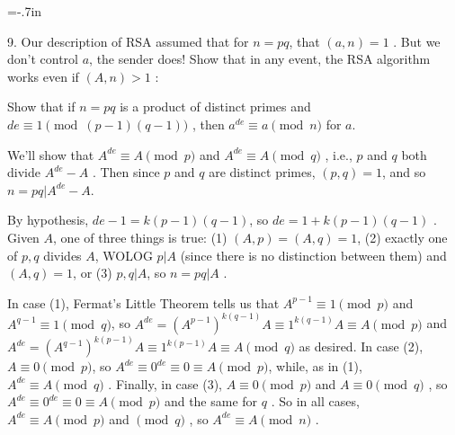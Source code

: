 



\loadmsbm

\voffset=-.7in
\vsize=8.6in



\ctln{\centerline}
\ssk{\smallskip}
\msk{\medskip}
\bsk{\bigskip}

\overfullrule=0pt
\nopagenumbers


\bsk

\item{9.} Our description of RSA assumed that for $n=pq$, that $(a,n)=1$ .
But we don't control $a$, the sender does! Show that in any event, the RSA algorithm works even if $(A,n)>1$ :

\ssk

\item{} Show that if $n=pq$ is a product of distinct primes and $de\equiv 1\pmod{(p-1)(q-1)}$ , 
then $a^{de}\equiv a \pmod{n}$ for  $a$.

\ssk

\item{} We'll show that $A^{de}\equiv A \pmod{p}$ and $A^{de}\equiv A \pmod{q}$ , i.e., $p$ and $q$ both divide
$A^{de}-A$ . Then since $p$ and $q$ are distinct primes, $(p,q)=1$, and so $n=pq|A^{de}-A$.

\ssk

\item{} By hypothesis, $de-1=k(p-1)(q-1)$, so $de=1+k(p-1)(q-1)$ . Given $A$, one of three things is true: (1) $(A,p)=(A,q)=1$, 
(2) exactly one of $p,q$ divides $A$, WOLOG $p|A$ (since there is no distinction between them) and $(A,q)=1$, or
(3) $p,q|A$, so $n=pq|A$ . 

\ssk

\item{} In case (1), Fermat's Little Theorem tells us that $A^{p-1}\equiv 1\pmod{p}$ and 
$A^{q-1}\equiv 1\pmod{q}$, so
$A^{de}=(A^{p-1})^{k(q-1)}A\equiv 1^{k(q-1)}A\equiv A\pmod{p}$ and 
$A^{de}=(A^{q-1})^{k(p-1)}A\equiv 1^{k(p-1)}A\equiv A\pmod{q}$
as desired. In case (2), $A\equiv 0\pmod{p}$, so $A^{de}\equiv 0^{de}\equiv 0\equiv A\pmod{p}$, 
while, as in (1), $A^{de}\equiv A\pmod{q}$ .
Finally, in case (3), $A\equiv 0\pmod{p}$ and $A\equiv 0\pmod{q}$ , so 
$A^{de}\equiv 0^{de}\equiv 0\equiv A\pmod{p}$ and the same for $q$ .
So in all cases, $A^{de}\equiv A\pmod{p}$ and $\pmod{q}$ , so $A^{de}\equiv A\pmod{n}$ .

